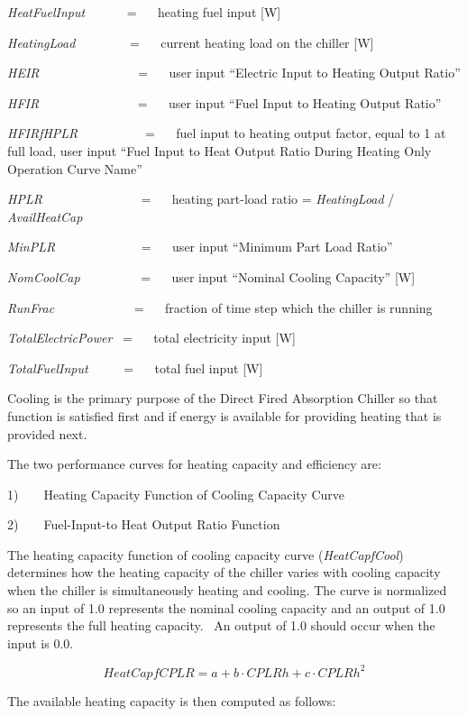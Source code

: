 \emph{HeatFuelInput}~~~~~~ = ~~ heating fuel input {[}W{]}

\emph{HeatingLoad}~~~~~~~~ = ~~ current heating load on the chiller {[}W{]}

\emph{HEIR}~~~~~~~~~~~~~~~ = ~~ user input ``Electric Input to Heating Output Ratio''

\emph{HFIR}~~~~~~~~~~~~~~~ = ~~ user input ``Fuel Input to Heating Output Ratio''

\emph{HFIRfHPLR}~~~~~~~~~~ = ~~ fuel input to heating output factor, equal to 1 at full load, user input ``Fuel Input to Heat Output Ratio During Heating Only Operation Curve Name''

\emph{HPLR}~~~~~~~~~~~~~~~ = ~~ heating part-load ratio = \emph{HeatingLoad} / \emph{AvailHeatCap}

\emph{MinPLR}~~~~~~~~~~~~~ = ~~ user input ``Minimum Part Load Ratio''

\emph{NomCoolCap}~~~~~~~~~ = ~~ user input ``Nominal Cooling Capacity'' {[}W{]}

\emph{RunFrac}~~~~~~~~~~~~ = ~~ fraction of time step which the chiller is running

\emph{TotalElectricPower}~ = ~~ total electricity input {[}W{]}

\emph{TotalFuelInput}~~~~~ = ~~ total fuel input {[}W{]}

Cooling is the primary purpose of the Direct Fired Absorption Chiller so that function is satisfied first and if energy is available for providing heating that is provided next.

The two performance curves for heating capacity and efficiency are:

1)~~~~Heating Capacity Function of Cooling Capacity Curve

2)~~~~Fuel-Input-to Heat Output Ratio Function

The heating capacity function of cooling capacity curve (\emph{HeatCapfCool}) determines how the heating capacity of the chiller varies with cooling capacity when the chiller is simultaneously heating and cooling. The curve is normalized so an input of 1.0 represents the nominal cooling capacity and an output of 1.0 represents the full heating capacity.~ An output of 1.0 should occur when the input is 0.0.

\begin{equation}
HeatCapfCPLR = a + b \cdot CPLRh + c \cdot CPLR{h^2}
\end{equation}

The available heating capacity is then computed as follows:

